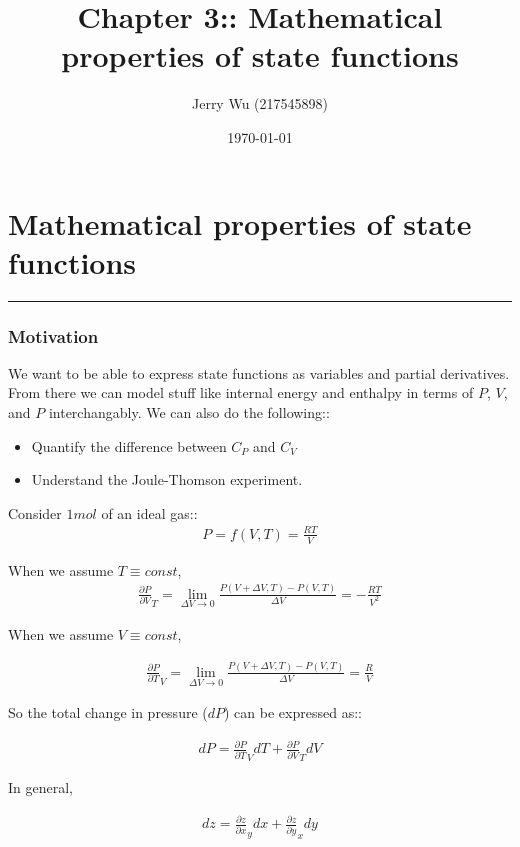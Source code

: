 \documentclass[12pt]{book}
\title{Chapter 3:: Mathematical properties of state functions}
\author{Jerry Wu (217545898)}
\date{\today}
\begin{document}
\maketitle
\chapter*{Mathematical properties of state functions}
\rule{\textwidth}{0.4pt}

\subsection*{Motivation}
We want to be able to express state functions as variables and partial derivatives. From there we can model stuff like internal energy and enthalpy in terms of $P$, $V$, and $P$ interchangably. We can also do the following::

\begin{itemize}
    \item Quantify the difference between $C_P$ and $C_V$
    \item Understand the Joule-Thomson experiment.
\end{itemize}

Consider $1mol$ of an ideal gas::
\begin{align*}
    P=f(V,T)=\frac{RT}{V}
\end{align*}

When we assume $T\equiv const$,
\begin{align*}
    \frac{\partial P}{\partial V}_T=\lim_{\Delta V\rightarrow 0}\frac{P(V+\Delta V,T)-P(V,T)}{\Delta V}=-\frac{RT}{V^2}
\end{align*}

When we assume $V\equiv const$,

\begin{align*}
    \frac{\partial P}{\partial T}_V=\lim_{\Delta V\rightarrow 0}\frac{P(V+\Delta V,T)-P(V,T)}{\Delta V}=\frac{R}{V}
\end{align*}

So the total change in pressure ($dP$) can be expressed as::

\begin{align*}
    dP=\frac{\partial P}{\partial T}_V dT+\frac{\partial P}{\partial V}_T dV
\end{align*}

In general, 

\begin{align*}
    dz=\frac{\partial z}{\partial x}_y dx + \frac{\partial z}{\partial y}_x dy
\end{align*}
\end{document}
